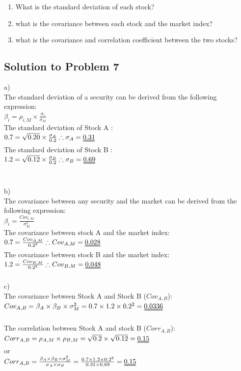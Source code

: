 \documentclass[12]{article}
\begin{document}
\begin{enumerate}
    \item[a)] What is the standard deviation of each stock?
    \item[b)] what is the covariance between each stock and the market index?
    \item[c)] what is the covariance and correlation coefficient between the two stocks? 
\end{enumerate}


\color{blue}
\subsection*{Solution to Problem 7}
a)\\
The standard deviation of a security can be derived from the following expression:\\
{\Large $\beta_i = \rho_{i,M} \times \frac{\sigma_i}{\sigma_M}$}\\
The standard deviation of Stock A : \\
{\large $0.7 = \sqrt{0.20} \times \frac{\sigma_A}{0.2} \therefore \sigma_A = \uuline{0.31}$}\\
The standard deviation of Stock B : \\
{\large $1.2 = \sqrt{0.12} \times \frac{\sigma_B}{0.2} \therefore \sigma_B = \uuline{0.69}$}\\
\\
\\
b)\\
The covariance between any security and the market can be derived from the following expression:\\
{\Large $\beta_i = \frac{Cov_{i,M}}{\sigma^2_M}$}\\
The covariance between stock A and the market index:\\
{\large $0.7 = \frac{Cov_{A,M}}{0.2^2} \therefore Cov_{A,M} = \uuline{0.028}$}\\
The covariance between stock B and the market index:\\
{\large $1.2 = \frac{Cov_{B,M}}{0.2^2} \therefore Cov_{B,M} = \uuline{0.048}$}
\\
\\
c)\\
The covariance between Stock A and Stock B ($Cov_{A,B}$):\\
{\large $Cov_{A,B} = \beta_A \times \beta_B \times \sigma^2_M = 0.7 \times 1.2 \times 0.2^2 = \uuline{0.0336}$}\\
\\
The correlation between Stock A and stock B ($Corr_{A,B}$):\\
{\large $Corr_{A,B} =  \rho_{A,M} \times \rho_{B,M} = \sqrt{0.2} \times \sqrt{0.12} = \uuline{0.15}$}\\
{\large or}\\
{\large $ Corr_{A,B} = \frac{\beta_A \times \beta_B \times \sigma^2_M}{\sigma_A \times \sigma_B} = \frac{0.7 \times 1.2 \times 0.2^2}{0.31 \times 0.69} = \uuline{0.15}$}\\
\end{document}

